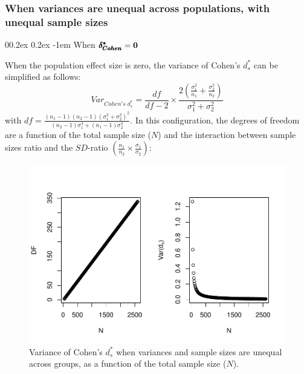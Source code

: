 \documentclass[
  english,
  man,mask]{apa6}
\makeatletter
\let\oldparagraph\paragraph
\renewcommand{\paragraph}[1]{\oldparagraph{#1}\mbox{}}
\renewcommand{\paragraph}{\@startsection{paragraph}{4}{\parindent}%
  {0\baselineskip \@plus 0.2ex \@minus 0.2ex}%
  {-1em}%
  {\normalfont\normalsize\bfseries\itshape\typesectitle}}
\makeatother
\begin{document}
\hypertarget{when-variances-are-unequal-across-populations-with-unequal-sample-sizes-1}{%
\subsubsection{When variances are unequal across populations, with unequal sample sizes}\label{when-variances-are-unequal-across-populations-with-unequal-sample-sizes-1}}

\hypertarget{when-bf-pmbdelta_cohen0-3}{%
\paragraph{\texorpdfstring{When \(\bf \pmb{\delta^*_{Cohen}}=0\)}{When \textbackslash bf \textbackslash pmb\{\textbackslash delta\^{}*\_\{Cohen\}\}=0}}\label{when-bf-pmbdelta_cohen0-3}}

When the population effect size is zero, the variance of Cohen's \(d^*_s\) can be simplified as follows:
\[Var_{Cohen's \; d^*_s} = \frac{df}{df-2} \times \frac{2\left( \frac{\sigma^2_1}{n_1} + \frac{\sigma^2_2}{n_2} \right)}{\sigma^2_1+\sigma^2_2}\]
with \(df =\frac{(n_1-1)(n_2-1)(\sigma^2_1+\sigma^2_2)^2}{(n_2-1)\sigma_1^4+(n_1-1)\sigma_2^4}\). In this configuration, the degrees of freedom are a function of the total sample size (\(N\)) and the interaction between sample sizes ratio and the \(SD\)-ratio \(\left(\frac{n_1}{n_2}\times\frac{\sigma_1}{\sigma_2} \right)\):

\begin{figure}
\centering
\includegraphics{Theoretical-Variance-of-all-estimators-as-a-function-of-population-parameters_files/figure-latex/varcohendprimehetunbalNsize2-1.pdf}
\caption{\label{fig:varcohendprimehetunbalNsize2}Variance of Cohen's \(d^*_s\) when variances and sample sizes are unequal across groups, as a function of the total sample size (\(N\)).}
\end{figure}
\end{document}
